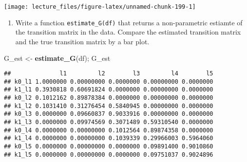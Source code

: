 \documentclass[
]{book}
\newenvironment{Shaded}{\begin{snugshade}}{\end{snugshade}}
\newcommand{\DataTypeTok}[1]{\textcolor[rgb]{0.13,0.29,0.53}{#1}}
\newcommand{\KeywordTok}[1]{\textcolor[rgb]{0.13,0.29,0.53}{\textbf{#1}}}
\newcommand{\NormalTok}[1]{#1}
\newcommand{\OperatorTok}[1]{\textcolor[rgb]{0.81,0.36,0.00}{\textbf{#1}}}
\newcommand{\StringTok}[1]{\textcolor[rgb]{0.31,0.60,0.02}{#1}}
\providecommand{\tightlist}{%
  \setlength{\itemsep}{0pt}\setlength{\parskip}{0pt}}
\begin{document}
\begin{Shaded}
\end{Shaded}

\begin{center}\texttt{[image: lecture\_files/figure-latex/unnamed-chunk-199-1]} \end{center}

\begin{enumerate}
\def\labelenumi{\arabic{enumi}.}
\setcounter{enumi}{8}
\tightlist
\item
  Write a function \texttt{estimate\_G(df)} that returns a non-parametric estiamte of the transition matrix in the data. Compare the estimated transition matrix and the true transition matrix by a bar plot.
\end{enumerate}

\begin{Shaded}
\begin{Highlighting}[]
\NormalTok{G_est <-}\StringTok{ }\KeywordTok{estimate_G}\NormalTok{(df); G_est}
\end{Highlighting}
\end{Shaded}

\begin{verbatim}
##              l1         l2        l3         l4        l5
## k0_l1 1.0000000 0.00000000 0.0000000 0.00000000 0.0000000
## k1_l1 0.3930818 0.60691824 0.0000000 0.00000000 0.0000000
## k0_l2 0.1012162 0.89878384 0.0000000 0.00000000 0.0000000
## k1_l2 0.1031410 0.31276454 0.5840945 0.00000000 0.0000000
## k0_l3 0.0000000 0.09660837 0.9033916 0.00000000 0.0000000
## k1_l3 0.0000000 0.09974569 0.3071489 0.59310540 0.0000000
## k0_l4 0.0000000 0.00000000 0.1012564 0.89874358 0.0000000
## k1_l4 0.0000000 0.00000000 0.1039339 0.29966003 0.5964060
## k0_l5 0.0000000 0.00000000 0.0000000 0.09891400 0.9010860
## k1_l5 0.0000000 0.00000000 0.0000000 0.09751037 0.9024896
\end{verbatim}
\end{document}
